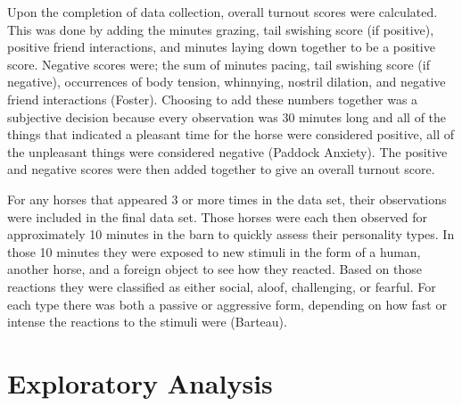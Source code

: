\documentclass[
]{article}
\begin{document}
Upon the completion of data collection, overall turnout scores were
calculated. This was done by adding the minutes grazing, tail swishing
score (if positive), positive friend interactions, and minutes laying
down together to be a positive score. Negative scores were; the sum of
minutes pacing, tail swishing score (if negative), occurrences of body
tension, whinnying, nostril dilation, and negative friend interactions
(Foster). Choosing to add these numbers together was a subjective
decision because every observation was 30 minutes long and all of the
things that indicated a pleasant time for the horse were considered
positive, all of the unpleasant things were considered negative (Paddock
Anxiety). The positive and negative scores were then added together to
give an overall turnout score.

For any horses that appeared 3 or more times in the data set, their
observations were included in the final data set. Those horses were each
then observed for approximately 10 minutes in the barn to quickly assess
their personality types. In those 10 minutes they were exposed to new
stimuli in the form of a human, another horse, and a foreign object to
see how they reacted. Based on those reactions they were classified as
either social, aloof, challenging, or fearful. For each type there was
both a passive or aggressive form, depending on how fast or intense the
reactions to the stimuli were (Barteau).

\hypertarget{exploratory-analysis}{%
\section{Exploratory Analysis}\label{exploratory-analysis}}
\end{document}
